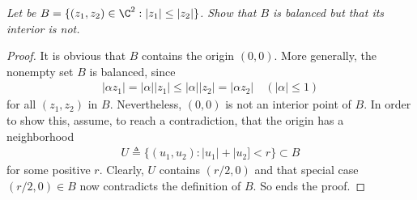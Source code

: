 \textit{Let be %
%
  $B = \{(z_{1}, z_{2}) \in \C^2: |z_{1}| \leq |z_{2}| \}$. %
%
Show that $B$ is balanced but that its interior is not.
}
%
\begin{proof}
It is obvious that $B$ contains the origin $(0,0)$. %
More generally, the nonempty set $B$ is balanced, since
\begin{align}
  |\alpha z_1|  = |\alpha| |z_1| \leq  |\alpha| |z_2| = |\alpha z_2| %
  \quad (|\alpha| \leq 1)
\end{align}
%
for all $(z_1, z_2)$ in $B$. %
Nevertheless, $(0, 0)$ is not an interior point of $B$. %
In order to show this, assume, to reach a contradiction, %
that the origin has a neighborhood %
%
\begin{align}
  U \triangleq \{(u_1, u_2): |u_1| + |u_2] < r \} \subset B %
\end{align}
%
for some positive $r$. Clearly, $U$ contains $(r/2, 0)$ %
and that special case $(r/2, 0) \in B$ now contradicts the definition of $B$. %
So ends the proof.
\end{proof}

